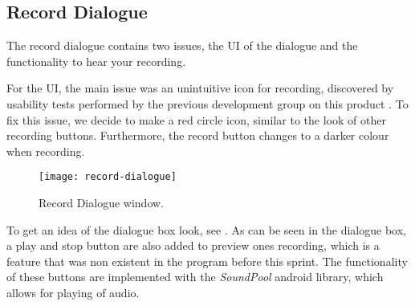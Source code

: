 \subsection{Record Dialogue}
The record dialogue contains two issues, the UI of the dialogue and the functionality to hear your recording.

For the UI, the main issue was an unintuitive icon for recording, discovered by usability tests performed by the previous development group on this product \citep{misc:crocold}. To fix this issue, we decide to make a red circle icon, similar to the look of other recording buttons. Furthermore, the record button changes to a darker colour when recording. 

\begin{figure}[h]
     \centering
     \texttt{[image: record-dialogue]}
     \caption{Record Dialogue window.}
     \label{fig:record-dialogue}
\end{figure}

To get an idea of the dialogue box look, see .
As can be seen in the dialogue box, a play and stop button are also added to preview ones recording, which is a feature that was non existent in the program before this sprint.
The functionality of these buttons are implemented with the \textit{SoundPool} android library, which allows for playing of audio.


